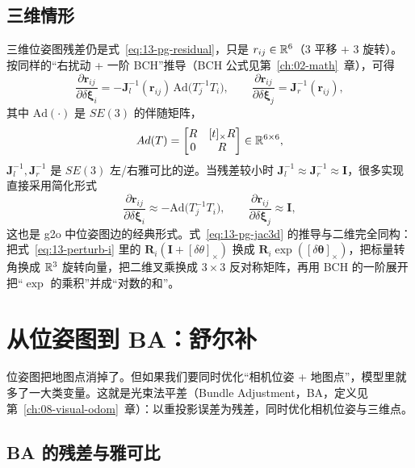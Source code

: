 \subsection{三维情形}

三维位姿图残差仍是式~\eqref{eq:13-pg-residual}，只是 $r_{ij}\in\mathbb{R}^{6}$（3 平移 $+$ 3 旋转）。按同样的``右扰动 + 一阶 BCH''推导（BCH 公式见第~\ref{ch:02-math}~章），可得
\begin{equation}
\frac{\partial\bm{r}_{ij}}{\partial\delta\bm{\xi}_i}
=-\bm{J}_l^{-1}(\bm{r}_{ij})\,\mathrm{Ad}\big(T_j^{-1}T_i\big),
\qquad
\frac{\partial\bm{r}_{ij}}{\partial\delta\bm{\xi}_j}
=\bm{J}_r^{-1}(\bm{r}_{ij}),
\label{eq:13-pg-jac3d}
\end{equation}
其中 $\mathrm{Ad}(\cdot)$ 是 $SE(3)$ 的伴随矩阵，
\begin{equation}
Ad(T)=\begin{bmatrix}R&[t]_\times R\\0&R\end{bmatrix}\in\mathbb{R}^{6\times6},
\end{equation}
$\bm{J}_l^{-1},\bm{J}_r^{-1}$ 是 $SE(3)$ 左/右雅可比的逆。当残差较小时 $\bm{J}_l^{-1}\approx\bm{J}_r^{-1}\approx\bm{I}$，很多实现直接采用简化形式
\begin{equation}
\frac{\partial\bm{r}_{ij}}{\partial\delta\bm{\xi}_i}\approx-\mathrm{Ad}\big(T_j^{-1}T_i\big),
\qquad
\frac{\partial\bm{r}_{ij}}{\partial\delta\bm{\xi}_j}\approx\bm{I},
\end{equation}
这也是 g2o\cite{kummerle2011g2o} 中位姿图边的经典形式。式~\eqref{eq:13-pg-jac3d} 的推导与二维完全同构：把式~\eqref{eq:13-perturb-i} 里的 $\bm{R}_i(\bm{I}+[\delta\theta]_\times)$ 换成 $\bm{R}_i\exp([\delta\bm{\theta}]_\times)$，把标量转角换成 $\mathbb{R}^{3}$ 旋转向量，把二维叉乘换成 $3\times3$ 反对称矩阵，再用 BCH 的一阶展开把``$\exp$ 的乘积''并成``对数的和''。

\section{从位姿图到 BA：舒尔补}\label{sec:13-schur}

位姿图把地图点消掉了。但如果我们要同时优化``相机位姿 + 地图点''，模型里就多了一大类变量。这就是光束法平差（Bundle Adjustment，BA，定义见第~\ref{ch:08-visual-odom}~章）：以重投影误差为残差，同时优化相机位姿与三维点。

\subsection{BA 的残差与雅可比}

